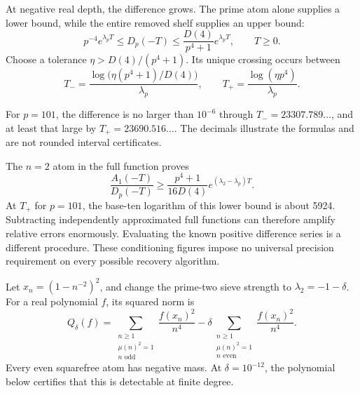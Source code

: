 At negative real depth, the difference grows. The prime atom alone supplies
a lower bound, while the entire removed shelf supplies an upper bound:
\[
p^{-4}e^{\lambda_pT}\le D_p(-T)
\le\frac{D(4)}{p^4+1}e^{\lambda_pT},\qquad T\ge0.
\]
Choose a tolerance $\eta>D(4)/(p^4+1)$. Its unique crossing occurs between
\[
T_- =\frac{\log\!\bigl(\eta(p^4+1)/D(4)\bigr)}{\lambda_p},
\qquad
T_+ =\frac{\log(\eta p^4)}{\lambda_p}.
\]


For $p=101$, the difference is no larger than $10^{-6}$ through
$T_-=23307.789\ldots$, and at least that large by
$T_+=23690.516\ldots$. The decimals illustrate the formulas and are not
rounded interval certificates.

The $n=2$ atom in the full function proves
\[
\frac{A_1(-T)}{D_p(-T)}
\ge\frac{p^4+1}{16D(4)}e^{(\lambda_2-\lambda_p)T}.
\]
At $T_+$ for $p=101$, the base-ten logarithm of this lower bound is about
5924. Subtracting independently approximated full functions can therefore
amplify relative errors enormously. Evaluating the known positive difference
series is a different procedure. These conditioning figures impose no
universal precision requirement on every possible recovery algorithm.

Let $x_n=(1-n^{-2})^2$, and change the prime-two sieve strength to
$\lambda_2=-1-\delta$. For a real polynomial $f$, its squared norm is
\[
Q_\delta(f)=\sum_{\substack{n\ge1\\\mu(n)^2=1\\n\text{ odd}}}
 \frac{f(x_n)^2}{n^4}
-\delta\sum_{\substack{n\ge1\\\mu(n)^2=1\\n\text{ even}}}
 \frac{f(x_n)^2}{n^4}.
\]
Every even squarefree atom has negative mass. At $\delta=10^{-12}$,
the polynomial below certifies that this is detectable at finite degree.


